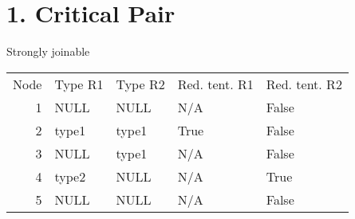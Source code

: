 \documentclass{article}
\begin{document}
\section{1. Critical Pair}  %

Strongly joinable  %
\label{sec:criticalpair:1}


\begin{tabular}{ r | l l | l l }
    Node & Type R1 & Type R2 & Red. tent. R1 & Red. tent. R2 \\
    1 & NULL  & NULL  & N/A  & False \\
    2 & type1 & type1 & True & False \\
    3 & NULL  & type1 & N/A  & False \\
    4 & type2 & NULL  & N/A  & True  \\
    5 & NULL  & NULL  & N/A  & False \\
\end{tabular}
    
\end{document}
